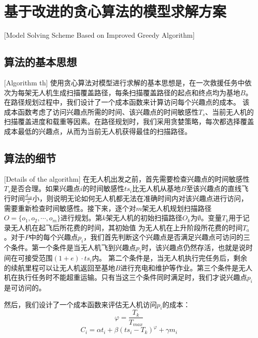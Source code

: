 
\chapter{基于改进的贪心算法的模型求解方案}[Model Solving Scheme Based on Improved Greedy Algorithm]

\section{算法的基本思想}[Algorithm th]
使用贪心算法对模型进行求解的基本思想是，在一次救援任务中依次为每架无人机生成扫描覆盖路径，每条扫描覆盖路径的起点和终点均为基地$B$。在路径规划过程中，我们设计了一个成本函数来计算访问每个兴趣点的成本。
该成本函数考虑了访问兴趣点所需的时间、该兴趣点的时间敏感性$T_s$、当前无人机的扫描覆盖进度和载重等因素。在路径规划时，我们采用贪婪策略，每次都选择覆盖成本最低的兴趣点，从而为当前无人机获得最佳的扫描路径。

\section{算法的细节}[Details of the algorithm]
在无人机出发之前，首先需要检查兴趣点的时间敏感性$T_s$是否合理。如果兴趣点$i$的时间敏感性$ts_i$比无人机从基地$B$至该兴趣点的直线飞行时间$\frac{d_{iB}}{v}$小，则说明无论如何无人机都无法在准确时间内对该兴趣点进行访问，
需要重新检查时间敏感性。接下来，逐个对$m$架无人机规划扫描路径$O=\lbrace o_1, o_2, \cdots ,o_m \rbrace$进行规划。第$k$架无人机的初始扫描路径$O_k$为$\emptyset$。变量$T_k$用于记录无人机在起飞后所花费的时间，其初始值
为无人机在上升阶段所花费的时间$T_a$。对于$P$中的每个兴趣点$p_i$，我们首先判断这个兴趣点是否满足兴趣点可访问的三个条件。第一个条件是当无人机飞到兴趣点$p_i$时，该兴趣点仍然存活，也就是说时间在可接受范围$(1+e) \cdot ts_i$内。
第二个条件是，当无人机执行完任务后，剩余的续航里程可以让无人机返回至基地$B$进行充电和维护等作业。第三个条件是无人机在执行任务时不能超重运输。只有当这三个条件同时满足时，我们才说兴趣点$p_i$是可访问的。


然后，我们设计了一个成本函数来评估无人机访问$p_i$的成本：
\begin{equation}
	\varphi = \frac{T_k}{T_{max}}
\end{equation}
\begin{equation}
	C_i = \alpha t_i + \beta (ts_i - T_k)^\varphi + \gamma m_i
\end{equation}

